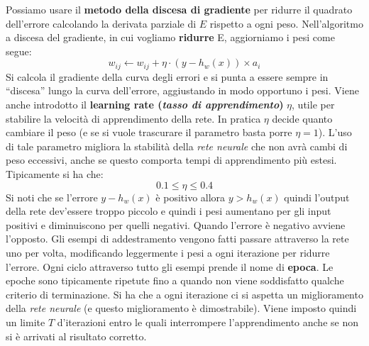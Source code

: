 Possiamo usare il \textbf{metodo della discesa di gradiente} per ridurre il quadrato dell'errore calcolando la derivata parziale di $E$ rispetto a ogni peso. Nell'algoritmo a discesa del gradiente, in cui vogliamo \textbf{ridurre} E, aggiorniamo i pesi come segue:
\[w_{ij}\gets w_{ij}+\eta\cdot(y-h_w(x))\times a_i\]
Si calcola il gradiente della curva degli errori e si punta a essere sempre in ``discesa'' lungo la curva dell'errore, aggiustando in modo opportuno i pesi. Viene anche introdotto il \textbf{learning rate (\textit{tasso di apprendimento})} $\eta$, utile per stabilire la velocità di apprendimento della rete. In pratica $\eta$ decide quanto cambiare il peso (e se si vuole trascurare il parametro basta porre $\eta =1$). L'uso di tale parametro migliora la stabilità della \textit{rete neurale} che non avrà cambi di peso eccessivi, anche se
questo comporta tempi di apprendimento più estesi. Tipicamente si ha che:
\[0.1\leq\eta\leq 0.4\]
Si noti che se l'errore $y-h_w(x)$ è positivo allora $y>h_w(x)$ quindi l'output della rete dev'essere troppo piccolo e quindi i pesi aumentano per gli input positivi e diminuiscono per quelli negativi. Quando l'errore è negativo avviene l'opposto. Gli esempi di addestramento vengono fatti passare attraverso la rete uno per volta, modificando leggermente i pesi a ogni iterazione per ridurre l'errore. Ogni ciclo attraverso tutto gli esempi prende il nome di \textbf{epoca}. Le epoche sono tipicamente ripetute fino a quando non viene soddisfatto qualche criterio di terminazione. Si ha che a ogni iterazione ci si aspetta un miglioramento della \textit{rete neurale} (e questo miglioramento è dimostrabile). Viene imposto
quindi un limite $T$ d'iterazioni entro le quali interrompere l'apprendimento anche se non si è arrivati al risultato
corretto.

